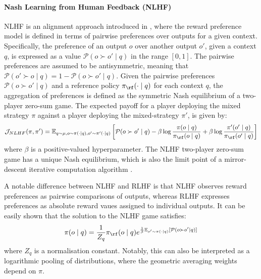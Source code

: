 \paragraph{Nash Learning from Human Feedback (NLHF)} NLHF is an alignment approach introduced in \citep{pmlr-v235-munos24a}, where the reward preference model is defined in terms of pairwise preferences over outputs for a given context. Specifically, the preference of an output $o$ over another output $o'$, given a context $q$, is expressed as a value $\mathcal{P}(o\succ o'\mid q)$ in the range $[0,1]$. The pairwise preferences are assumed to be antisymmetric, meaning that $\mathcal{P}(o'\succ o\mid q)=1-\mathcal{P}(o\succ o'\mid q)$. Given the pairwise preferences $\mathcal{P}(o\succ o'\mid q)$ and a reference policy $\pi_\rf(\cdot\mid q)$ for each context $q$, the aggregation of preferences is defined as the symmetric Nash equilibrium of a two-player zero-sum game. The expected payoff for a player deploying the mixed strategy $\pi$ against a player deploying the mixed-strategy $\pi'$, is given by:
\begin{equation}
\mathcal{J}_{NLHF}(\pi,\pi') = \mathbb{E}_{q\sim \mu, o\sim \pi(\cdot\mid q), o'\sim \pi'(\cdot\mid q)}\left[\mathcal{P}(o\succ o'\mid q) - \beta \log\frac{\pi(o\mid q)}{\pi_\rf(o\mid q)} + \beta \log\frac{\pi'(o'\mid q)}{\pi_\rf(o'\mid q)}\right]
\label{equ:nlhf}
\end{equation}
where $\beta$ is a positive-valued hyperparameter. The NLHF two-player zero-sum game has a unique Nash equilibrium, which is also the limit point of a mirror-descent iterative computation algorithm \citep{pmlr-v235-munos24a}. 

A notable difference between NLHF and RLHF is that NLHF observes reward preferences as pairwise comparisons of outputs, whereas RLHF expresses preferences as absolute reward vaues assigned to individual outputs. It can be easily shown that the solution to the NLHF game satisfies:
$$
\pi(o\mid q) = \frac{1}{Z_q}\pi_\rf(o\mid q) e^{\frac{1}{\beta}\mathbb{E}_{o'\sim \pi(\cdot\mid q)}[\mathcal{P}(o\succ o'\mid q)]}
$$
where $Z_q$ is a normalisation constant. Notably, this can also be interpreted as a logarithmic pooling of distributions, where the geometric averaging weights depend on $\pi$.